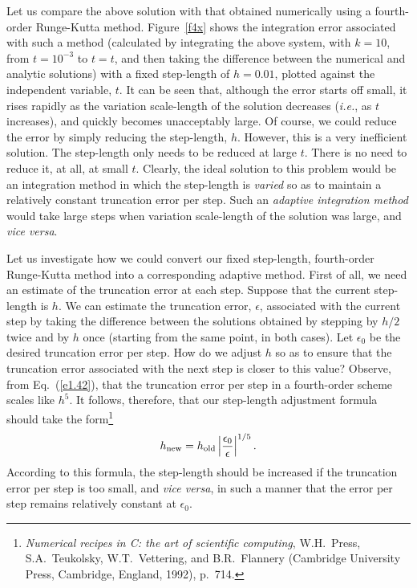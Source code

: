Let us compare the above solution with that obtained numerically using 
a fourth-order Runge-Kutta method. Figure~\ref{f4x} shows the integration error
associated with such a method (calculated by integrating the above system, with $k=10$,
from $t=10^{-3}$ to $t=t$, and then taking the difference between the numerical and analytic
solutions) with a fixed step-length of $h=0.01$,  plotted against the independent variable, $t$.
It can be seen that, although the error starts off small, it rises rapidly as the
variation scale-length of the solution decreases ({\em i.e.}, as $t$ increases), and
quickly becomes unacceptably large. Of course, we could reduce the error by simply reducing
the step-length, $h$. However, this is a very inefficient solution. The step-length
only needs to be reduced at large $t$. There is no need to reduce it, at all,  at small $t$.
Clearly, the ideal solution to this problem would be an integration method in which
the step-length is {\em  varied}\/ so as to maintain a relatively constant truncation error
per step. Such an {\em adaptive integration method}\/ would take large steps when variation
scale-length of the solution was large, and {\em vice versa}.

Let us investigate how we could convert our fixed step-length, fourth-order Runge-Kutta
method into a corresponding adaptive method. First of all, we need an estimate of the
truncation error at each step. Suppose that the current step-length is $h$. We can
estimate the  truncation error, $\epsilon$, associated with
the current step  by taking the difference between the solutions obtained by stepping
by $h/2$ twice and by $h$ once (starting from the same point,
in both cases). Let $\epsilon_0$ be the desired truncation
error per step. How do we adjust $h$ so as to ensure that the truncation error
associated with the next step is closer to this value? Observe, from Eq.~(\ref{e1.42}),
that the truncation error per step in a fourth-order scheme scales like $h^5$. It
follows, therefore, that our step-length adjustment formula should take the form\footnote{{\em Numerical recipes in C: the
art of scientific computing}, W.H.~Press, S.A.~Teukolsky, W.T.~Vettering, and
B.R.~Flannery (Cambridge University Press, Cambridge, England, 1992), p.~714.}
\begin{equation}
h_{\rm new} = h_{\rm old}\left|\frac{\epsilon_0}{\epsilon}\right|^{1/5}.
\end{equation}
According to this formula, the step-length should be increased if the truncation error
per step is too small, and {\em vice versa}, in such a manner that the
error per step remains relatively constant at $\epsilon_0$.  

